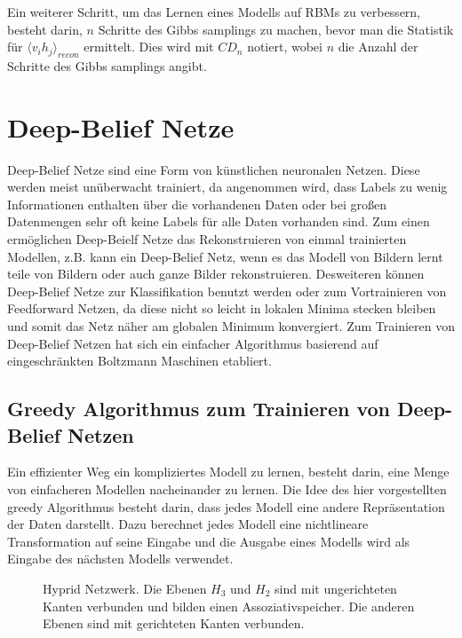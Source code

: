 \documentclass[12pt]{article}
\begin{document}
Ein weiterer Schritt, um das Lernen eines Modells auf RBMs zu verbessern, besteht darin, $n$ Schritte des Gibbs samplings zu machen, bevor man die Statistik für $\langle v_i h_j \rangle_{recon}$ ermittelt. Dies wird mit $CD_n$ notiert, wobei $n$ die Anzahl der Schritte des Gibbs samplings angibt.

\section{Deep-Belief Netze}
Deep-Belief Netze sind eine Form von künstlichen neuronalen Netzen. Diese werden meist unüberwacht trainiert, da angenommen wird, dass Labels zu wenig Informationen enthalten über die vorhandenen Daten oder bei großen Datenmengen sehr oft keine Labels für alle Daten vorhanden sind. Zum einen ermöglichen Deep-Beielf Netze das Rekonstruieren von einmal trainierten Modellen, z.B. kann ein Deep-Belief Netz, wenn es das Modell von Bildern lernt teile von Bildern oder auch ganze Bilder rekonstruieren. Desweiteren können Deep-Belief Netze zur Klassifikation benutzt werden oder zum Vortrainieren von Feedforward Netzen, da diese nicht so leicht in lokalen Minima stecken bleiben und somit das Netz näher am globalen Minimum konvergiert. Zum Trainieren von Deep-Belief Netzen hat sich ein einfacher Algorithmus basierend auf eingeschränkten Boltzmann Maschinen etabliert.

\subsection{Greedy Algorithmus zum Trainieren von Deep-Belief Netzen}


Ein effizienter Weg ein kompliziertes Modell zu lernen, besteht darin, eine Menge von einfacheren Modellen nacheinander zu lernen. Die Idee des hier vorgestellten greedy Algorithmus besteht darin, dass jedes Modell eine andere Repräsentation der Daten darstellt. Dazu berechnet jedes Modell eine nichtlineare Transformation auf seine Eingabe und die Ausgabe eines Modells wird als Eingabe des nächsten Modells verwendet. 

\begin{figure}[H]
	\center
	
	\caption{Hyprid Netzwerk. Die Ebenen $H_3$ und $H_2$ sind mit ungerichteten Kanten verbunden und bilden einen Assoziativspeicher. Die anderen Ebenen sind mit gerichteten Kanten verbunden.}
	\label{Netz}
\end{figure}
\end{document}
